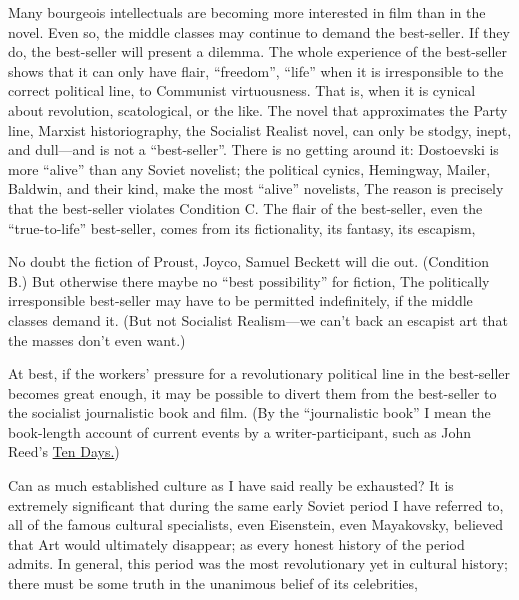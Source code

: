 Many bourgeois intellectuals are becoming more interested in film than in the novel. Even so, the middle classes may continue to demand the best-seller. If they do, the best-seller will present a dilemma. The whole experience of the best-seller shows that it can only have flair, \enquote{freedom}, \enquote{life} when it is irresponsible to the correct political line, to Communist virtuousness. That is, when it is cynical about revolution, scatological, or the like. The novel that approximates the Party line, Marxist historiography, the Socialist Realist novel, can only be stodgy, inept, and dull---and is not a \enquote{best-seller}. There is no getting around it: Dostoevski is more \enquote{alive} than any Soviet novelist; the political cynics, Hemingway, Mailer, Baldwin, and their kind, make the most \enquote{alive} novelists, The reason is precisely that the best-seller violates Condition C. The flair of the best-seller, even the \enquote{true-to-life} best-seller, comes from its fictionality, its fantasy, its escapism, 

No doubt the fiction of Proust, Joyco, Samuel Beckett will die out. (Condition B.) But otherwise there maybe no \enquote{best possibility} for fiction, The politically irresponsible best-seller may have to be permitted indefinitely, if the middle classes demand it. (But not Socialist Realism---we can't back an escapist art that the masses don't even want.)

At best, if the workers' pressure for a revolutionary political line in the best-seller becomes great enough, it may be possible to divert them from the best-seller to the socialist journalistic book and film. (By the \enquote{journalistic book} I mean the book-length account of current events by a writer-participant, such as John Reed's \uline{Ten Days.}) 


Can as much established culture as I have said really be exhausted? It is extremely significant that during the same early Soviet period I have referred to, all of the famous cultural specialists, even Eisenstein, even Mayakovsky, believed that Art would ultimately disappear; as every honest history of the period admits. In general, this period was the most revolutionary yet in cultural history; there must be some truth in the unanimous belief of its celebrities, 

